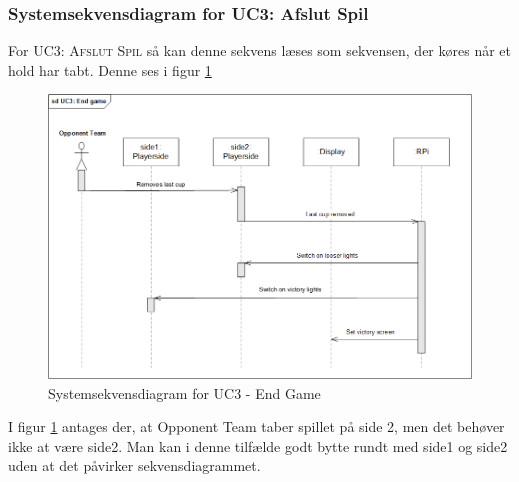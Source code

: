 \documentclass[Rapport/Rapport_main.tex]{subfiles}
\begin{document}
\subsubsection{Systemsekvensdiagram for UC3: Afslut Spil}
For \textsc{UC3: Afslut Spil} så kan denne sekvens læses som sekvensen, der køres når et hold har tabt. Denne ses i figur \ref{fig:rap_sd_UC3}
\begin{figure}[H]
    \centering 
    \includegraphics[width=\textwidth]{Arkitektur/Sekvensdiagrammer/graphics/sd_UC3.png}
    \caption{Systemsekvensdiagram for UC3 - End Game}
    \label{fig:rap_sd_UC3}
\end{figure}
I figur \ref{fig:rap_sd_UC3} antages der, at Opponent Team taber spillet på side 2, men det behøver ikke at være side2. Man kan i denne tilfælde godt bytte rundt med side1 og side2 uden at det påvirker sekvensdiagrammet.
\end{document}
